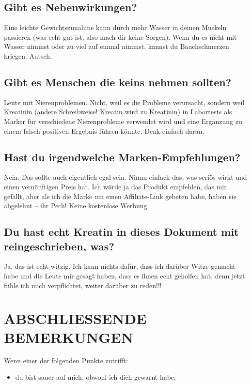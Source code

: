 \documentclass{article}
\begin{document}
{{{\subsection{Gibt es Nebenwirkungen?}

Eine leichte Gewichtszunahme kann durch mehr Wasser in deinen Muskeln passieren (was echt gut ist, also mach dir keine Sorgen). Wenn du es nicht mit Wasser nimmst oder zu viel auf einmal nimmst, kannst du Bauchschmerzen kriegen. Autsch.

\subsection{Gibt es Menschen die keins nehmen sollten?}

Leute mit Nierenproblemen. Nicht, weil es die Probleme verursacht, sondern weil Kreatinin (andere Schreibweise! Kreatin wird zu Kreatinin) in Labortests als Marker für verschiedene Nierenprobleme verwendet wird und eine Ergänzung zu einem falsch positiven Ergebnis führen könnte. Denk einfach daran.

\subsection{Hast du irgendwelche Marken-Empfehlungen?}

Nein. Das sollte auch eigentlich egal sein. Nimm einfach das, was seriös wirkt und einen vernünftigen Preis hat. Ich würde ja das Produkt empfehlen, das mir gefällt, aber als ich die Marke um einen Affiliate-Link gebeten habe, haben sie abgelehnt – ihr Pech! Keine kostenlose Werbung.

\subsection{Du hast echt Kreatin in dieses Dokument mit reingeschrieben, was?}

Ja, das ist echt witzig. Ich kann nichts dafür, dass ich darüber Witze gemacht habe und die Leute mir gesagt haben, dass es ihnen echt geholfen hat, denn jetzt fühle ich mich verpflichtet, weiter darüber zu reden!!!

\section{ABSCHLIESSENDE BEMERKUNGEN}

Wenn einer der folgenden Punkte zutrifft:

\begin{itemize}
\item du bist sauer auf mich, obwohl ich dich gewarnt habe;


\end{itemize}}}}
\end{document}
